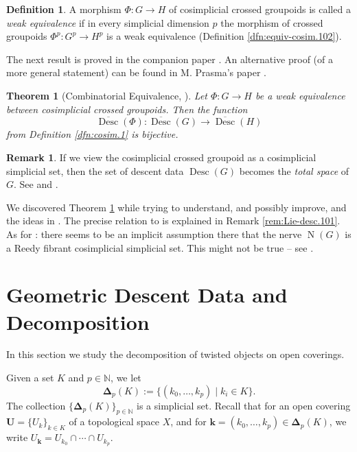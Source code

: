 \documentclass[a4paper, 10pt]{amsart}
\newtheorem{thm}[equation]{Theorem}
\theoremstyle{definition}
\newtheorem{dfn}[equation]{Definition}
\newtheorem{rem}[equation]{Remark}
\numberwithin{equation}{section}
\newcommand{\opn}{\operatorname}
\newcommand{\ol}{\overline}
\newcommand{\mbb}[1]{\mathbb{#1}}
\newcommand{\tup}[1]{\textup{#1}}
\newcommand{\bsym}[1]{\boldsymbol{#1}}
\newcommand{\N}{\mbb{N}}
\begin{document}
\begin{dfn} \label{dfn:equiv-cosim.103}
A morphism $\Phi : G \to H$
of cosimplicial crossed groupoids is called a {\em weak equivalence} if in
every simplicial dimension $p$ the morphism of crossed groupoids
 $\Phi^p : G^p \to H^p$ is a weak equivalence (Definition
\ref{dfn:equiv-cosim.102}).
\end{dfn}

The next result is proved in the companion paper \cite{Ye8}.
An alternative proof (of a more general statement) can be found in M. Prasma's
paper \cite{Pr}. 

\begin{thm}[{Combinatorial Equivalence, \cite[Theorem 0.1]{Ye8}}]
\label{thm:100} 
Let $\Phi : G \to H$ be a weak equivalence between 
cosimplicial crossed groupoids. Then the function 
\[ \ol{\opn{Desc}}(\Phi) : \ol{\opn{Desc}}(G) \to
\ol{\opn{Desc}}(H) \]
from Definition \tup{\ref{dfn:cosim.1}} is bijective.
\end{thm}

\begin{rem} \label{rem:cosim.106}
If  we view the cosimplicial crossed groupoid as a cosimplicial simplicial set,
then the set of descent data  $\opn{Desc}(G)$ becomes the {\em total space} of
$G$. See \cite{BGNT2} and \cite{Pr}.

We discovered Theorem \ref{thm:100} while trying to understand, and possibly
improve, \cite[Proposition 3.3.1]{BGNT1} and the ideas in \cite{CH}. 
The precise relation to \cite[Proposition 3.3.1]{BGNT1} is explained in Remark
\ref{rem:Lie-desc.101}. As for \cite{CH}: there seems to be an implicit
assumption there that the nerve $\opn{N}(G)$ is a Reedy fibrant
cosimplicial simplicial set. This might not be true -- see \cite{Pr}.
\end{rem}






\section{Geometric Descent Data and Decomposition}
\label{sec:mdd}

In this section we study the decomposition of twisted objects on open
coverings.

Given a set $K$ and $p \in \N$, we let 
\begin{equation} \label{eqn:mdd.111}
\bsym{\Delta}_p(K) := \{ (k_0, \ldots, k_p) \mid k_i \in K \} .
\end{equation}
The collection $\{ \bsym{\Delta}_p(K) \}_{p \in \N}$ is a simplicial set. 
Recall that for an open covering $\bsym{U} = \{ U_k \}_{k \in K}$ of a
topological space $X$, and for 
$\bsym{k} = (k_0, \ldots, k_p) \in \bsym{\Delta}_p(K)$, 
we write 
$U_{\bsym{k}} = U_{k_0} \cap \cdots \cap U_{k_p}$.
\end{document}
